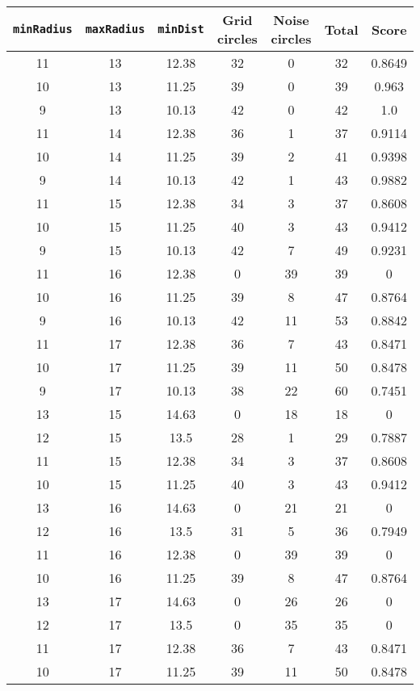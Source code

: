 \documentclass[letterpaper, 12pt]{article}
\begin{document}
\begin{longtable}{|c|c|c|c|c|c|c|}
\hline
\textbf{\texttt{minRadius}} & \textbf{\texttt{maxRadius}} & \textbf{\texttt{minDist}} & \textbf{Grid circles} & \textbf{Noise circles} & \textbf{Total} & \textbf{Score} \\
\hline
11 & 13 & 12.38 & 32 & 0 & 32 & 0.8649 \\
\hline
10 & 13 & 11.25 & 39 & 0 & 39 & 0.963 \\
\hline
9 & 13 & 10.13 & 42 & 0 & 42 & 1.0 \\
\hline
11 & 14 & 12.38 & 36 & 1 & 37 & 0.9114 \\
\hline
10 & 14 & 11.25 & 39 & 2 & 41 & 0.9398 \\
\hline
9 & 14 & 10.13 & 42 & 1 & 43 & 0.9882 \\
\hline
11 & 15 & 12.38 & 34 & 3 & 37 & 0.8608 \\
\hline
10 & 15 & 11.25 & 40 & 3 & 43 & 0.9412 \\
\hline
9 & 15 & 10.13 & 42 & 7 & 49 & 0.9231 \\
\hline
11 & 16 & 12.38 & 0 & 39 & 39 & 0 \\
\hline
10 & 16 & 11.25 & 39 & 8 & 47 & 0.8764 \\
\hline
9 & 16 & 10.13 & 42 & 11 & 53 & 0.8842 \\
\hline
11 & 17 & 12.38 & 36 & 7 & 43 & 0.8471 \\
\hline
10 & 17 & 11.25 & 39 & 11 & 50 & 0.8478 \\
\hline
9 & 17 & 10.13 & 38 & 22 & 60 & 0.7451 \\
\hline
13 & 15 & 14.63 & 0 & 18 & 18 & 0 \\
\hline
12 & 15 & 13.5 & 28 & 1 & 29 & 0.7887 \\
\hline
11 & 15 & 12.38 & 34 & 3 & 37 & 0.8608 \\
\hline
10 & 15 & 11.25 & 40 & 3 & 43 & 0.9412 \\
\hline
13 & 16 & 14.63 & 0 & 21 & 21 & 0 \\
\hline
12 & 16 & 13.5 & 31 & 5 & 36 & 0.7949 \\
\hline
11 & 16 & 12.38 & 0 & 39 & 39 & 0 \\
\hline
10 & 16 & 11.25 & 39 & 8 & 47 & 0.8764 \\
\hline
13 & 17 & 14.63 & 0 & 26 & 26 & 0 \\
\hline
12 & 17 & 13.5 & 0 & 35 & 35 & 0 \\
\hline
11 & 17 & 12.38 & 36 & 7 & 43 & 0.8471 \\
\hline
10 & 17 & 11.25 & 39 & 11 & 50 & 0.8478 \\

\end{longtable}
\end{document}
